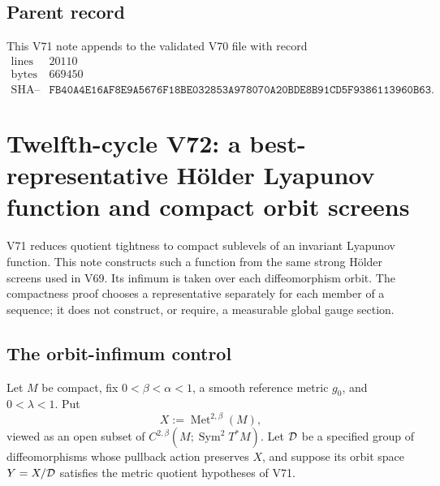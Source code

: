 \documentclass[11pt]{article}
\theoremstyle{remark}
\begin{document}
\subsection{Parent record}

This V71 note appends to the validated V70 file with record
\[
\begin{array}{c|c}
\text{lines}&20110\\
\text{bytes}&669450\\
\text{SHA--256}&
\texttt{FB40A4E16AF8E9A5676F18BE032853A978070A20BDE8B91CD5F9386113960B63}.
\end{array}
\]



\section{Twelfth-cycle V72: a best-representative Hölder Lyapunov
function and compact orbit screens}
\label{sec:v12v72}

V71 reduces quotient tightness to compact sublevels of an invariant
Lyapunov function.  This note constructs such a function from the
same strong Hölder screens used in V69.  Its infimum is taken over
each diffeomorphism orbit.  The compactness proof chooses a
representative separately for each member of a sequence; it does not
construct, or require, a measurable global gauge section.

\subsection{The orbit-infimum control}

Let \(M\) be compact, fix \(0<\beta<\alpha<1\), a smooth reference
metric \(g_0\), and \(0<\lambda<1\).  Put
\[
 X:=\operatorname{Met}^{2,\beta}(M),
\]
viewed as an open subset of
\(C^{2,\beta}(M;\operatorname{Sym}^2T^*M)\).  Let
\({\cal D}\) be a specified group of diffeomorphisms whose pullback
action preserves \(X\), and suppose its orbit space \(Y=X/{\cal D}\)
satisfies the metric quotient hypotheses of V71.
\end{document}
